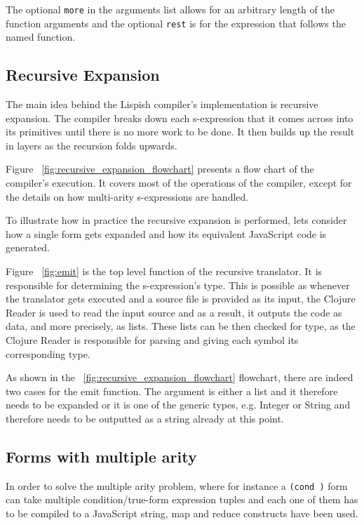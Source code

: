 The optional \texttt{more} in the arguments list allows for an arbitrary length of the function arguments and the optional \texttt{rest} is for the expression that follows the named function.

\subsection{Recursive Expansion}
The main idea behind the Lispish compiler's implementation is recursive expansion.
The compiler breaks down each s-expression that it comes across into its primitives until there is no more work to be done. It then builds up the result in layers as the recursion folds upwards. 

Figure ~\ref{fig:recursive_expansion_flowchart} presents a flow chart of the compiler's execution. It covers most of the operations of the compiler, except for the details on how multi-arity s-expressions are handled.  



To illustrate how in practice the recursive expansion is performed, lets consider how a single form gets expanded and how its equivalent JavaScript code is generated. 



Figure ~\ref{fig:emit} is the top level function of the recursive translator. It is responsible for determining the s-expression's type. This is possible as whenever the translator gets executed and a source file is provided as its input, the Clojure Reader is used to read the input source and as a result, it outputs the code as data, and more precisely, as lists. 
These lists can be then checked for type, as the Clojure Reader is responsible for parsing and giving each symbol its corresponding type.

As shown in the ~\ref{fig:recursive_expansion_flowchart} flowchart, there are indeed two cases for the emit function. The argument is either a list and it therefore needs to be expanded or it is one of the generic types, e.g. Integer or String and therefore needs to be outputted as a string already at this point. 

\subsection{Forms with multiple arity}

In order to solve the multiple arity problem, where for instance a \texttt{(cond )} form can take multiple condition/true-form expression tuples and each one of them has to be compiled to a JavaScript string, map and reduce constructs have been used. 

